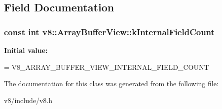 \subsection{Field Documentation}
\hypertarget{classv8_1_1ArrayBufferView_a1cccb675b1a91e61411fee5918d451db}{}
\subsubsection[{k\+Internal\+Field\+Count}]{\setlength{\rightskip}{0pt plus 5cm}const int v8\+::\+Array\+Buffer\+View\+::k\+Internal\+Field\+Count\hspace{0.3cm}{\ttfamily [static]}}\label{classv8_1_1ArrayBufferView_a1cccb675b1a91e61411fee5918d451db}
{\bfseries Initial value\+:}
\begin{DoxyCode}
=
      V8\_ARRAY\_BUFFER\_VIEW\_INTERNAL\_FIELD\_COUNT
\end{DoxyCode}


The documentation for this class was generated from the following file\+:\begin{DoxyCompactItemize}
\item 
v8/include/v8.\+h\end{DoxyCompactItemize}
